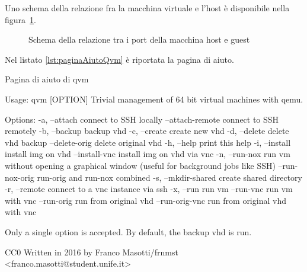 \documentclass[10pt,titlepage,twoside,a4paper]{report}
\newenvironment{code}{\singlespacing\captionsetup{type=listing}}{}
\begin{document}
Uno schema della relazione fra la macchina virtuale e l'host è disponibile 
nella figura~\ref{fig:schemaPortsQvm}.

\begin{figure}[H]
\centering
\caption{Schema della relazione tra i port della macchina host e guest}
\label{fig:schemaPortsQvm}
\end{figure}

Nel listato \ref{lst:paginaAiutoQvm} è riportata la pagina di aiuto.

\begin{code}
    \caption{Pagina di aiuto di qvm}
    \label{lst:paginaAiutoQvm}
    \begin{textcode*}{}
Usage: qvm [OPTION]
Trivial management of 64 bit virtual machines with qemu.

Options:
    -a, --attach                connect to SSH locally
        --attach-remote         connect to SSH remotely
    -b, --backup                backup vhd
    -c, --create                create new vhd
    -d, --delete                delete vhd backup
        --delete-orig           delete original vhd
    -h, --help                  print this help
    -i, --install               install img on vhd
        --install-vnc           install img on vhd via vnc
    -n, --run-nox               run vm without opening a graphical window
                                (useful for background jobs like SSH)
        --run-nox-orig          run-orig and run-nox combined
    -s, --mkdir-shared          create shared directory
    -r, --remote                connect to a vnc instance via ssh
    -x, --run                   run vm
        --run-vnc               run vm with vnc
        --run-orig              run from original vhd
        --run-orig-vnc          run from original vhd with vnc


Only a single option is accepted.
By default, the backup vhd is run.

CC0
Written in 2016 by Franco Masotti/frnmst <franco.masotti@student.unife.it>
    \end{textcode*}
\end{code}
\end{document}
